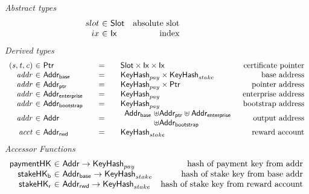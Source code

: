 \begin{figure*}[hbt]
  \emph{Abstract types}
  \begin{equation*}
    \begin{array}{r@{~\in~}lr}
      slot & \Slot & \text{absolute slot}\\
      ix & \Ix & \text{index}\\
    \end{array}
  \end{equation*}
  \emph{Derived types}
  \begin{equation*}
    \begin{array}{r@{~\in~}l@{\qquad=\qquad}lr}
      \var{(s,t,c)}
      & \Ptr
      & \Slot\times\Ix\times\Ix
      & \text{certificate pointer}
      \\
      \var{addr}
      & \AddrB
      & \KeyHash_{pay}\times\KeyHash_{stake}
      & \text{base address}
      \\
      \var{addr}
      & \AddrP
      & \KeyHash_{pay}\times\Ptr
      & \text{pointer address}
      \\
      \var{addr}
      & \AddrE
      & \KeyHash_{pay}
      & \text{enterprise address}
      \\
      \var{addr}
      & \AddrBS
      & \KeyHash_{pay}
      & \text{bootstrap address}
      \\
      \var{addr}
      & \Addr
      & \begin{array}{l@{~\uniondistinct}l}
          \AddrB & \AddrP \uniondistinct \AddrE
          \\
                 & \AddrBS
        \end{array}
      & \text{output address}
      \\
      \var{acct}
      & \AddrRWD
      & \KeyHash_{stake}
      & \text{reward account}
      \\
    \end{array}
  \end{equation*}
  \emph{Accessor Functions}
  \begin{equation*}
    \begin{array}{r@{~\in~}lr}
      \fun{paymentHK} & \Addr \to \KeyHash_{pay}
                      & \text{hash of payment key from addr}\\
      \fun{stakeHK_b} & \AddrB \to \KeyHash_{stake}
                      & \text{hash of stake key from base addr}\\
      \fun{stakeHK_r} & \AddrRWD \to \KeyHash_{stake}
                      & \text{hash of stake key from reward account}\\

\end{array}
\end{equation*}
\end{figure*}
